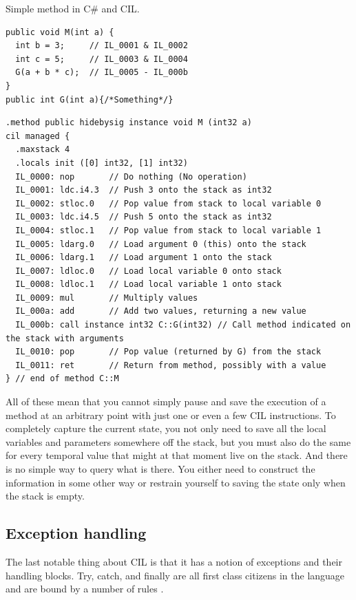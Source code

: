 \begin{listing}[h]
	\caption{Simple method in C\# and CIL.}
	\label{list2.1}
\begin{verbatim}
public void M(int a) {
  int b = 3;     // IL_0001 & IL_0002
  int c = 5;     // IL_0003 & IL_0004   
  G(a + b * c);  // IL_0005 - IL_000b
}
public int G(int a){/*Something*/}
\end{verbatim}
\begin{verbatim}
.method public hidebysig instance void M (int32 a) 
cil managed {
  .maxstack 4
  .locals init ([0] int32, [1] int32)
  IL_0000: nop       // Do nothing (No operation)
  IL_0001: ldc.i4.3  // Push 3 onto the stack as int32
  IL_0002: stloc.0   // Pop value from stack to local variable 0
  IL_0003: ldc.i4.5  // Push 5 onto the stack as int32
  IL_0004: stloc.1   // Pop value from stack to local variable 1
  IL_0005: ldarg.0   // Load argument 0 (this) onto the stack
  IL_0006: ldarg.1   // Load argument 1 onto the stack
  IL_0007: ldloc.0   // Load local variable 0 onto stack
  IL_0008: ldloc.1   // Load local variable 1 onto stack
  IL_0009: mul       // Multiply values
  IL_000a: add       // Add two values, returning a new value
  IL_000b: call instance int32 C::G(int32) // Call method indicated on the stack with arguments
  IL_0010: pop       // Pop value (returned by G) from the stack
  IL_0011: ret       // Return from method, possibly with a value
} // end of method C::M
\end{verbatim}
\end{listing}

All of these mean that you cannot simply pause and save the execution of a method at an arbitrary point with just one or even a few CIL instructions. To completely capture the current state, you not only need to save all the local variables and parameters somewhere off the stack, but you must also do the same for every temporal value that might at that moment live on the stack. And there is no simple way to query what is there. You either need to construct the information in some other way or restrain yourself to saving the state only when the stack is empty.

\subsection{Exception handling}

The last notable thing about CIL is that it has a notion of exceptions and their handling blocks. Try, catch, and finally are all first class citizens in the language and are bound by a number of rules \citep[Sec. I.12.4]{CLIEcma}.

